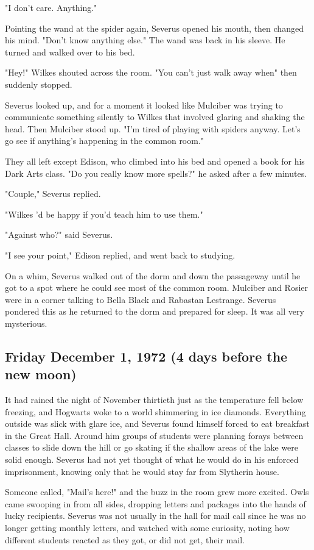 "I don't care. Anything."

Pointing the wand at the spider again, Severus opened his mouth, then changed his mind. "Don't know{\el} anything else." The wand was back in his sleeve. He turned and walked over to his bed.

"Hey!" Wilkes shouted across the room. "You can't just walk away when{\el}" then suddenly stopped.

Severus looked up, and for a moment it looked like Mulciber was trying to communicate something silently to Wilkes that involved glaring and shaking the head. Then Mulciber stood up. "I'm tired of playing with spiders anyway. Let's go see if anything's happening in the common room."

They all left except Edison, who climbed into his bed and opened a book for his Dark Arts class. "Do you really know more spells?" he asked after a few minutes.

"Couple," Severus replied.

"Wilkes 'd be happy if you'd teach him to use them."

"Against who?" said Severus.

"I see your point," Edison replied, and went back to studying.

On a whim, Severus walked out of the dorm and down the passageway until he got to a spot where he could see most of the common room. Mulciber and Rosier were in a corner talking to Bella Black and Rabastan Lestrange. Severus pondered this as he returned to the dorm and prepared for sleep. It was all very mysterious.

\subsection{Friday December 1, 1972 (4 days before the new moon)}

It had rained the night of November thirtieth just as the temperature fell below freezing, and Hogwarts woke to a world shimmering in ice diamonds. Everything outside was slick with glare ice, and Severus found himself forced to eat breakfast in the Great Hall. Around him groups of students were planning forays between classes to slide down the hill or go skating if the shallow areas of the lake were solid enough. Severus had not yet thought of what he would do in his enforced imprisonment, knowing only that he would stay far from Slytherin house.

Someone called, "Mail's here!" and the buzz in the room grew more excited. Owls came swooping in from all sides, dropping letters and packages into the hands of lucky recipients. Severus was not usually in the hall for mail call since he was no longer getting monthly letters, and watched with some curiosity, noting how different students reacted as they got, or did not get, their mail.


